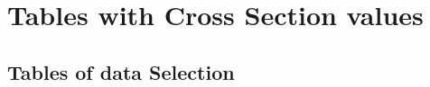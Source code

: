 \chapter{Tables with Cross Section values}
\label{Ap:XsecTables}
 
\section{Tables of data Selection}

